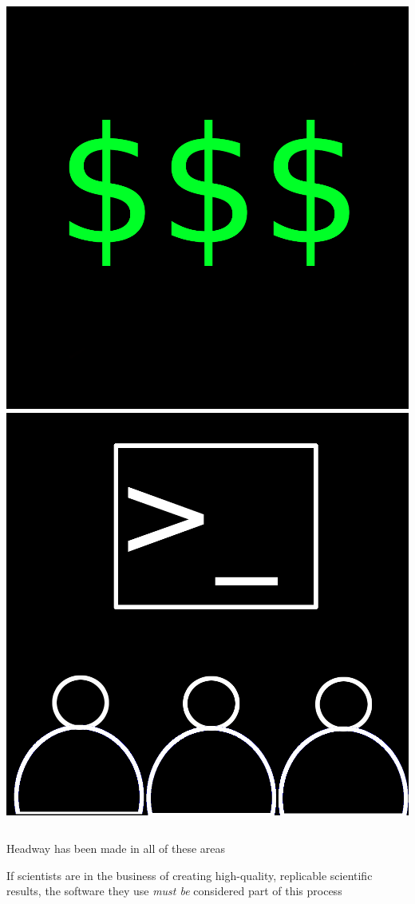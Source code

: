 \documentclass{beamer}
\begin{document}
\begin{frame}
\begin{columns}
\begin{columns}
\includegraphics[width=\textwidth]{money2.png}
\includegraphics[width=\textwidth]{review2.png}
\end{columns}
\end{columns}

\vspace{1cm}
\centering \Large Headway has been made in all of these areas
\end{frame}

\begin{frame}
\centering \LARGE If scientists are in the business of creating high-quality, replicable scientific results, the software they use \textit{must be} considered part of this process
\end{frame}
\end{document}
